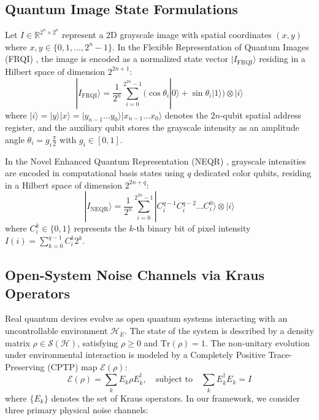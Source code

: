 \documentclass[12pt,onecolumn,draftclsnofoot]{IEEEtran}
\begin{document}
\subsection{Quantum Image State Formulations}
Let $I \in \mathbb{R}^{2^n \times 2^n}$ represent a 2D grayscale image with spatial coordinates $(x, y)$ where $x, y \in \{0, 1, \dots, 2^n - 1\}$. In the Flexible Representation of Quantum Images (FRQI) \cite{le2011flexible}, the image is encoded as a normalized state vector $|I_{\text{FRQI}}\rangle$ residing in a Hilbert space of dimension $2^{2n+1}$:
\begin{equation}
|I_{\text{FRQI}}\rangle = \frac{1}{2^n} \sum_{i=0}^{2^{2n}-1} \Big( \cos \theta_i |0\rangle + \sin \theta_i |1\rangle \Big) \otimes |i\rangle
\end{equation}
where $|i\rangle = |y\rangle |x\rangle = |y_{n-1} \dots y_0\rangle |x_{n-1} \dots x_0\rangle$ denotes the $2n$-qubit spatial address register, and the auxiliary qubit stores the grayscale intensity as an amplitude angle $\theta_i = g_i \frac{\pi}{2}$ with $g_i \in [0, 1]$.

In the Novel Enhanced Quantum Representation (NEQR) \cite{zhang2013neqr}, grayscale intensities are encoded in computational basis states using $q$ dedicated color qubits, residing in a Hilbert space of dimension $2^{2n+q}$:
\begin{equation}
|I_{\text{NEQR}}\rangle = \frac{1}{2^n} \sum_{i=0}^{2^{2n}-1} |C_i^{q-1} C_i^{q-2} \dots C_i^0\rangle \otimes |i\rangle
\end{equation}
where $C_i^k \in \{0, 1\}$ represents the $k$-th binary bit of pixel intensity $I(i) = \sum_{k=0}^{q-1} C_i^k 2^k$.

\subsection{Open-System Noise Channels via Kraus Operators}
Real quantum devices evolve as open quantum systems interacting with an uncontrollable environment $\mathcal{H}_E$. The state of the system is described by a density matrix $\rho \in \mathcal{S}(\mathcal{H})$, satisfying $\rho \ge 0$ and $\text{Tr}(\rho) = 1$. The non-unitary evolution under environmental interaction is modeled by a Completely Positive Trace-Preserving (CPTP) map $\mathcal{E}(\rho)$:
\begin{equation}
\mathcal{E}(\rho) = \sum_{k} E_k \rho E_k^\dagger, \quad \text{subject to} \quad \sum_{k} E_k^\dagger E_k = I
\end{equation}
where $\{E_k\}$ denotes the set of Kraus operators. In our framework, we consider three primary physical noise channels:
\end{document}
